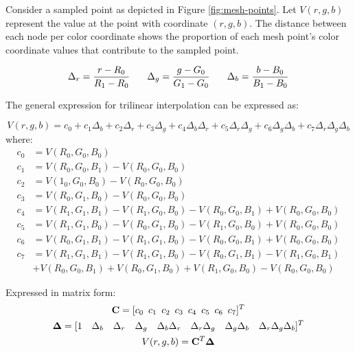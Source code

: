
Consider a sampled point as depicted in Figure \ref{fig:mesh-points}. Let $V(r,g,b)$ represent the value at the point with coordinate $(r,g,b)$. The distance between each node per color coordinate shows the proportion of each mesh point's color coordinate values that contribute to the sampled point.

\begin{equation}
    \Delta_r = \frac{r - R_0}{R_1 - R_0} \hspace{0.25in}
    \Delta_g = \frac{g - G_0}{G_1 - G_0} \hspace{0.25in}
    \Delta_b = \frac{b - B_0}{B_1 - B_0}
\end{equation}

The general expression for trilinear interpolation can be expressed as:

\begin{equation}
    V(r,g,b) = c_0 + c_1\Delta_b + c_2\Delta_r + c_3\Delta_g + c_4\Delta_b\Delta_r + c_5\Delta_r\Delta_g + c_6\Delta_g\Delta_b + c_7\Delta_r\Delta_g\Delta_b
\end{equation}
\tabto{0.5in}where: \\
\begin{equation*}
\begin{aligned}
    c_0 &= V(R_0, G_0, B_0) \\
    c_1 &= V(R_0, G_0, B_1) - V(R_0, G_0, B_0) \\
    c_2 &= V(1_0, G_0, B_0) - V(R_0, G_0, B_0) \\
    c_3 &= V(R_0, G_1, B_0) - V(R_0, G_0, B_0) \\
    c_4 &= V(R_1, G_1, B_1) - V(R_1, G_0, B_0) - V(R_0, G_0, B_1) + V(R_0, G_0, B_0) \\
    c_5 &= V(R_1, G_1, B_0) - V(R_0, G_1, B_0) - V(R_1, G_0, B_0) + V(R_0, G_0, B_0) \\
    c_6 &= V(R_0, G_1, B_1) - V(R_1, G_1, B_0) - V(R_0, G_0, B_1) + V(R_0, G_0, B_0) \\
    c_7 &= V(R_1, G_1, B_1) - V(R_1, G_1, B_0) - V(R_0, G_1, B_1) - V(R_1, G_0, B_1) \\ 
        &+ V(R_0, G_0, B_1) + V(R_0, G_1, B_0) + V(R_1, G_0, B_0) - V(R_0, G_0, B_0) 
\end{aligned}    
\end{equation*}

Expressed in matrix form:
\begin{gather}
    \mathbf{C} = [c_0 \enspace c_1 \enspace c_2 \enspace c_3 \enspace c_4 \enspace c_5 \enspace c_6 \enspace c_7]^T \\
    \mathbf{\Delta} = [1 \quad \Delta_b \quad \Delta_r \quad \Delta_g \quad \Delta_b\Delta_r \quad \Delta_r\Delta_g \quad \Delta_g\Delta_b \quad \Delta_r\Delta_g\Delta_b]^T \\
    V(r,g,b) = \mathbf{C}^T \mathbf{\Delta}
\end{gather}

